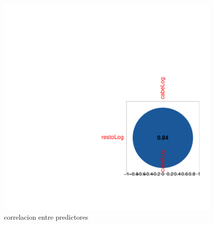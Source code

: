 


\begin{figure}[H]
\centering
\includegraphics[width=\textwidth,trim={7cm 2cm 0 6cm},clip]{bivariada-corrPlotX}
\caption{correlacion entre predictores}
\label{corrPlotX}
\end{figure}


\clearpage


\endinput
